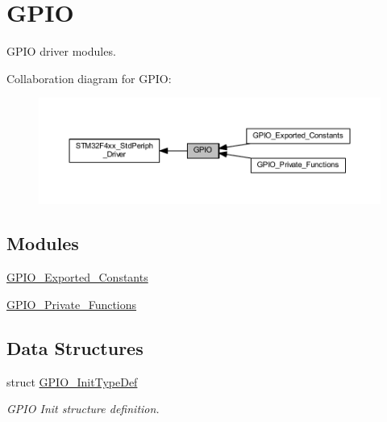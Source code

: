 \hypertarget{group___g_p_i_o}{}\section{G\+P\+IO}
\label{group___g_p_i_o}


G\+P\+IO driver modules.  


Collaboration diagram for G\+P\+IO\+:\nopagebreak
\begin{figure}[H]
\begin{center}
\leavevmode
\includegraphics[width=350pt]{group___g_p_i_o}
\end{center}
\end{figure}
\subsection*{Modules}
\begin{DoxyCompactItemize}
\item 
\hyperlink{group___g_p_i_o___exported___constants}{G\+P\+I\+O\+\_\+\+Exported\+\_\+\+Constants}
\item 
\hyperlink{group___g_p_i_o___private___functions}{G\+P\+I\+O\+\_\+\+Private\+\_\+\+Functions}
\end{DoxyCompactItemize}
\subsection*{Data Structures}
\begin{DoxyCompactItemize}
\item 
struct \hyperlink{struct_g_p_i_o___init_type_def}{G\+P\+I\+O\+\_\+\+Init\+Type\+Def}
\begin{DoxyCompactList}\small\item\em G\+P\+IO Init structure definition. \end{DoxyCompactList}\end{DoxyCompactItemize}
